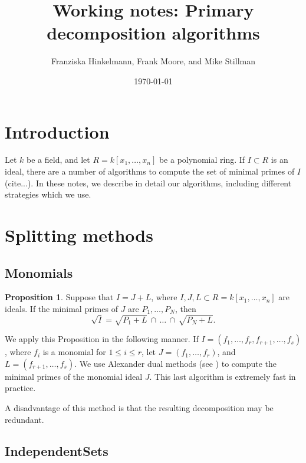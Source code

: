 \documentclass{amsart}
\title{Working notes: Primary decomposition algorithms}
\author{Franziska Hinkelmann, Frank Moore, and Mike Stillman}
\date{\today}
\theoremstyle{definition}
\newtheorem{proposition}[theorem]{Proposition}
\begin{document}
\maketitle
\setcounter{tocdepth}{1}
\tableofcontents


\section{Introduction}

Let $k$ be a field, and let $R = k[x_1, \ldots, x_n]$ be a polynomial ring.  
If $I \subset R$ is an ideal, there are a number of algorithms to compute the
set of minimal primes of $I$ (cite...).  In these notes, we describe in detail
our algorithms, including different strategies which we use.

\section{Splitting methods}

\subsection{Monomials}

\begin{proposition}
Suppose that $I = J + L$, where $I, J, L \subset R = k[x_1, \ldots, x_n]$ are ideals.
If the minimal primes of $J$ are $P_1, \ldots, P_N$, then 
  $$\sqrt{I} = \sqrt{P_1 + L} \,\cap\, \ldots \,\cap\, \sqrt{P_N + L}.$$
\end{proposition}

\bigskip

We apply this Proposition in the following manner.  If $I = (f_1,
\ldots, f_r, f_{r+1}, \ldots, f_s)$, where $f_i$ is a monomial for $1
\leq i \leq r$, let $J = (f_1, \ldots, f_r)$, and $L = (f_{r+1},
\ldots, f_s)$.  We use Alexander dual methods (see
\cite{frobby-paper}) to compute the minimal primes of the monomial
ideal $J$.  This last algorithm is extremely fast in practice.

A disadvantage of this method is that the resulting decomposition may be redundant.

\subsection{IndependentSets}
\end{document}
